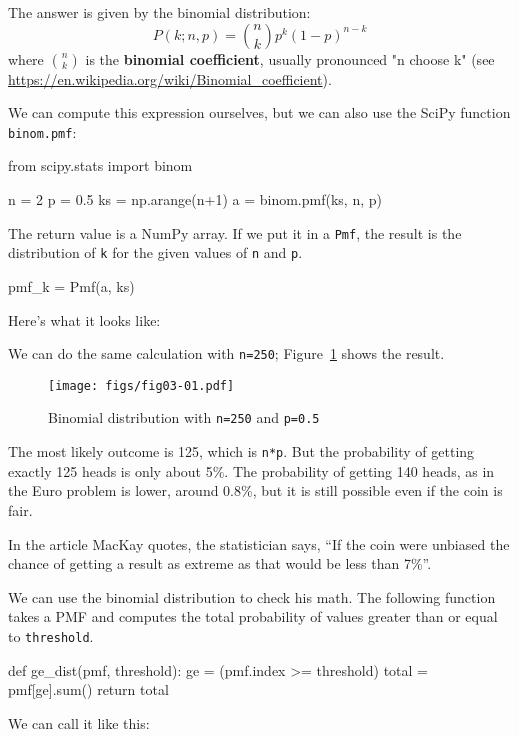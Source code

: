 \documentclass[12pt]{book}
\theoremstyle{exercise}
\newcommand{\py}[1]{{\tt #1}}%
\begin{document}
The answer is given by the binomial distribution:
%
\[ P(k; n, p) = \binom{n}{k} p^k (1-p)^{n-k} \]
%
where $\binom{n}{k}$ is the {\bf binomial coefficient}, usually pronounced "n choose k" (see \url{https://en.wikipedia.org/wiki/Binomial_coefficient}).

We can compute this expression ourselves, but we can also use the SciPy function \py{binom.pmf}:

\begin{code}
from scipy.stats import binom

n = 2
p = 0.5
ks = np.arange(n+1)
a = binom.pmf(ks, n, p)
\end{code}

The return value is a NumPy array.
If we put it in a \py{Pmf}, the result is the distribution of \py{k} for the given values of \py{n} and \py{p}.

\begin{code}
pmf_k = Pmf(a, ks)
\end{code}

Here's what it looks like:



We can do the same calculation with \py{n=250}; Figure~\ref{fig03-01} shows the result.

\begin{figure}
\centerline{\texttt{[image: figs/fig03-01.pdf]}}
\caption{Binomial distribution with \py{n=250} and \py{p=0.5}}
\label{fig03-01}
\end{figure}

The most likely outcome is 125, which is \py{n*p}.
But the probability of getting exactly 125 heads is only about 5\%.
The probability of getting 140 heads, as in the Euro problem is lower, around 0.8\%, but it is still possible even if the coin is fair.

In the article MacKay quotes, the statistician says, ``If the coin were unbiased the chance of getting a result as extreme as that would be less than 7\%''.

We can use the binomial distribution to check his math.  The following function takes a PMF and computes the total probability of values greater than or equal to \py{threshold}.

\begin{code}
def ge_dist(pmf, threshold):
    ge = (pmf.index >= threshold)
    total = pmf[ge].sum()
    return total
\end{code}

We can call it like this:
\end{document}
